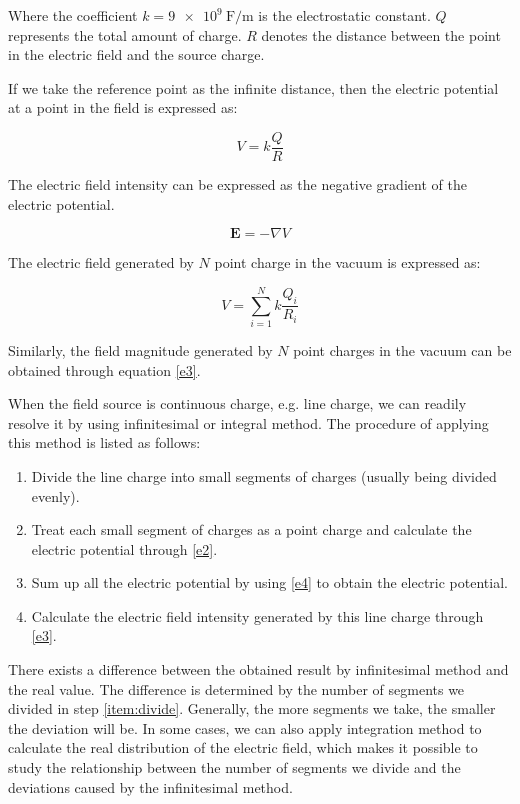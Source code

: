 \documentclass[journal]{IEEEtran}
\begin{document}
Where the coefficient $k = \SI[per-mode=symbol]{9e9}{\farad\per\meter}$ is the electrostatic constant. $Q$ represents the total amount of charge. $R$ denotes the distance between the point in the electric field and the source charge.

If we take the reference point as the infinite distance, then the electric potential at a point in the field is expressed as:

\begin{equation}\label{e2}
    V =
    k\frac{Q}{R}
\end{equation}

The electric field intensity can be expressed as the negative gradient of the electric potential.

\begin{equation}\label{e3}
    \mathbf{E} = -\nabla V
\end{equation}

The electric field generated by $N$ point charge in the vacuum is expressed as:

\begin{equation}\label{e4}
    V = \sum_{i=1}^N k\frac{Q_i}{R_i}
\end{equation}

Similarly, the field magnitude generated by $N$ point charges in the vacuum can be obtained through equation \eqref{e3}.

When the field source is continuous charge, e.g. line charge, we can readily resolve it by using infinitesimal or integral method. The procedure of applying this method is listed as follows:

\begin{enumerate}
    \item Divide the line charge into small segments of charges (usually being divided evenly).\label{item:divide}
    \item Treat each small segment of charges as a point charge and calculate the electric potential through \eqref{e2}.
    \item Sum up all the electric potential by using \eqref{e4} to obtain the electric potential.
    \item Calculate the electric field intensity generated by this line charge through \eqref{e3}.
\end{enumerate}

There exists a difference between the obtained result by infinitesimal method and the real value. The difference is determined by the number of segments we divided in step \ref{item:divide}. Generally, the more segments we take, the smaller the deviation will be. In some cases, we can also apply integration method to calculate the real distribution of the electric field, which makes it possible to study the relationship between the number of segments we divide and the deviations caused by the infinitesimal method.
\end{document}
